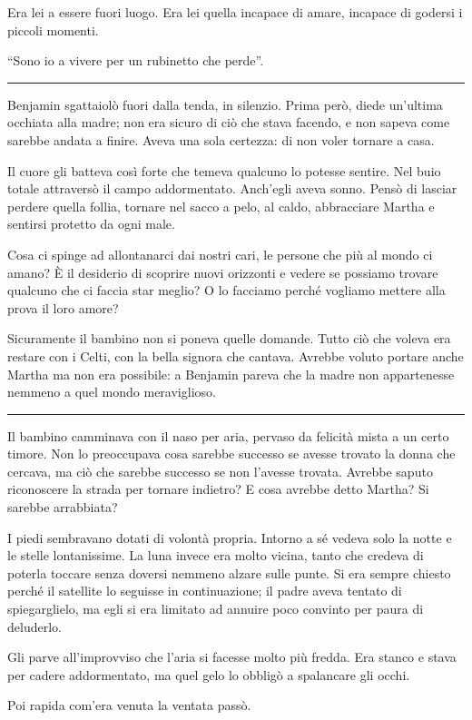 Era lei a essere fuori luogo. Era lei quella incapace di amare, incapace di godersi i piccoli
momenti.

``Sono io a vivere per un rubinetto che perde''.

\plainbreak{1}

Benjamin sgattaiolò fuori dalla tenda, in silenzio. Prima però, diede un'ultima occhiata alla madre;
non era sicuro di ciò che stava facendo, e non sapeva come sarebbe andata a finire. Aveva una sola
certezza: di non voler tornare a casa.

Il cuore gli batteva così forte che temeva qualcuno lo potesse sentire. Nel buio totale attraversò
il campo addormentato. Anch'egli aveva sonno. Pensò di lasciar perdere quella follia, tornare nel
sacco a pelo, al caldo, abbracciare Martha e sentirsi protetto da ogni male.

Cosa ci spinge ad allontanarci dai nostri cari, le persone che più al mondo ci amano? È il desiderio
di scoprire nuovi orizzonti e vedere se possiamo trovare qualcuno che ci faccia star meglio? O lo
facciamo perché vogliamo mettere alla prova il loro amore?

Sicuramente il bambino non si poneva quelle domande. Tutto ciò che voleva era restare con i Celti,
con la bella signora che cantava. Avrebbe voluto portare anche Martha ma non era possibile: a
Benjamin pareva che la madre non appartenesse nemmeno a quel mondo meraviglioso.

\plainbreak{1}

Il bambino camminava con il naso per aria, pervaso da felicità mista a un certo timore. Non lo
preoccupava cosa sarebbe successo se avesse trovato la donna che cercava, ma ciò che sarebbe
successo se non l'avesse trovata. Avrebbe saputo riconoscere la strada per tornare indietro? E cosa
avrebbe detto Martha? Si sarebbe arrabbiata?

I piedi sembravano dotati di volontà propria. Intorno a sé vedeva solo la notte e le stelle
lontanissime. La luna invece era molto vicina, tanto che credeva di poterla toccare senza doversi
nemmeno alzare sulle punte. Si era sempre chiesto perché il satellite lo seguisse in continuazione;
il padre aveva tentato di spiegarglielo, ma egli si era limitato ad annuire poco convinto per paura
di deluderlo.

Gli parve all'improvviso che l'aria si facesse molto più fredda. Era stanco e stava per cadere
addormentato, ma quel gelo lo obbligò a spalancare gli occhi.

Poi rapida com'era venuta la ventata passò.

